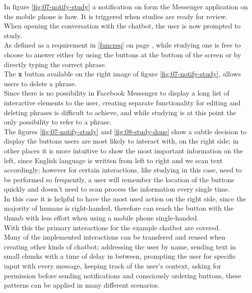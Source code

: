 In figure \ref{fig:07-notify-study} a notification on form the Messenger application on the mobile phone is how.
It is triggered when studies are ready for review.
\\
When opening the conversation with the chatbot,
the user is now prompted to study.
\\
As defined as a requirement in \ref{funcreq} on page \pageref{funcreq},
while studying one is free to choose to answer either by using the buttons at the bottom of the screen
or by directly typing the correct phrase.
\\

The \textbf{x} button available on the right image of figure \ref{fig:07-notify-study},
allows users to delete a phrase.
\\
Since there is no possibility in Facebook Messenger to display a long list of interactive elements to the user,
creating separate functionality for editing and deleting phrases is difficult to achieve,
and while studying is at this point the only possibility to refer to a phrase.
\\

The figures \ref{fig:07-notify-study} and \ref{fig:08-study-done} show a subtle decision to display the buttons users are most likely to interact with,
on the right side;
in other places it is more intuitive to show the most important information on the left,
since English language is written from left to right and we scan text accordingly;
however for certain interactions, like studying in this case, need to be performed so frequently,
a user will remember the location of the buttons quickly and doesn't need to scan process the information every single time.
\\
In this case it is helpful to have the most used action on the right side, since the majority of humans is right-handed,
therefore can reach the button with the thumb with less effort when using a mobile phone single-handed.
\\


With this the primary interactions for the example chatbot are covered.
\\
Many of the implemented interactions can be transfered and reused when creating other kinds of chatbot;
addressing the user by name,
sending text in small chunks with a time of delay in between,
prompting the user for specific input with every message,
keeping track of the user's context,
asking for permission before sending notifications and
consciously ordering buttons,
these patterns can be applied in many different scenarios.


